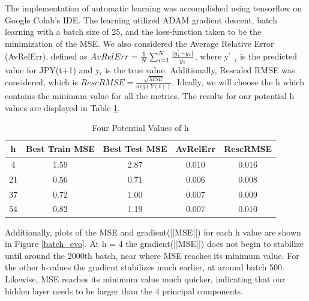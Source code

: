 \documentclass{homework}
\begin{document}
The implementation of automatic learning was accomplished using tensorflow on Google Colab's IDE. The learning utilized ADAM gradient descent, batch learning with a batch size of 25, and the loss-function taken to be the minimization of the MSE. We also  considered the Average Relative Error (AvRelErr), defined as \begin{math} AvRelErr = \frac{1}{N}\sum_{i=1}^{N} \frac{|y^`_i - y_i|}{y_i} \end{math}, where y$^`$ $_i$ is the predicted value for JPY(t+1) and y$_i$ is the true value. Additionally, Rescaled RMSE was considered, which is \begin{math} RescRMSE = \frac{\sqrt{MSE}}{avg(Y(t))} \end{math}. Ideally, we will choose the h which contains the minimum value for all the metrics. The results for our potential h values are displayed in Table \ref{h_select}.

\begin{table}[H]
    \centering
    \begin{tabular}{c|cccc}
         h&Best Train MSE&Best Test MSE&AvRelErr&RescRMSE\\\hline
         4&1.59&2.87&0.010&0.016 \\
         21&0.56&0.71&0.006&0.008\\
         37&0.72&1.00&0.007&0.009\\
         54&0.82&1.19&0.007&0.010
    \end{tabular}
    \caption{Four Potential Values of h}
    \label{h_select}
\end{table}

Additionally, plots of the MSE and gradient(||MSE||) for each h value are shown in Figure \ref{batch_evo}. At h = 4 the gradient(||MSE||) does not begin to stabilize until around the 2000th batch, near where MSE reaches its minimum value. For the other h-values the gradient stabilizes much earlier, at around batch 500. Likewise, MSE reaches its minimum value much quicker, indicating that our hidden layer needs to be larger than the 4 principal components. \newpage  
\end{document}
